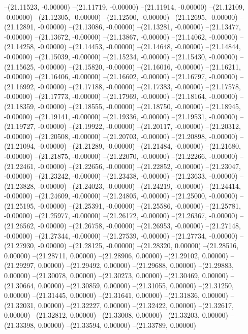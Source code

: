 --(21.11523, -0.00000)
--(21.11719, -0.00000)
--(21.11914, -0.00000)
--(21.12109, -0.00000)
--(21.12305, -0.00000)
--(21.12500, -0.00000)
--(21.12695, -0.00000)
--(21.12891, -0.00000)
--(21.13086, -0.00000)
--(21.13281, -0.00000)
--(21.13477, -0.00000)
--(21.13672, -0.00000)
--(21.13867, -0.00000)
--(21.14062, -0.00000)
--(21.14258, -0.00000)
--(21.14453, -0.00000)
--(21.14648, -0.00000)
--(21.14844, -0.00000)
--(21.15039, -0.00000)
--(21.15234, -0.00000)
--(21.15430, -0.00000)
--(21.15625, -0.00000)
--(21.15820, -0.00000)
--(21.16016, -0.00000)
--(21.16211, -0.00000)
--(21.16406, -0.00000)
--(21.16602, -0.00000)
--(21.16797, -0.00000)
--(21.16992, -0.00000)
--(21.17188, -0.00000)
--(21.17383, -0.00000)
--(21.17578, -0.00000)
--(21.17773, -0.00000)
--(21.17969, -0.00000)
--(21.18164, -0.00000)
--(21.18359, -0.00000)
--(21.18555, -0.00000)
--(21.18750, -0.00000)
--(21.18945, -0.00000)
--(21.19141, -0.00000)
--(21.19336, -0.00000)
--(21.19531, -0.00000)
--(21.19727, -0.00000)
--(21.19922, -0.00000)
--(21.20117, -0.00000)
--(21.20312, -0.00000)
--(21.20508, -0.00000)
--(21.20703, -0.00000)
--(21.20898, -0.00000)
--(21.21094, -0.00000)
--(21.21289, -0.00000)
--(21.21484, -0.00000)
--(21.21680, -0.00000)
--(21.21875, -0.00000)
--(21.22070, -0.00000)
--(21.22266, -0.00000)
--(21.22461, -0.00000)
--(21.22656, -0.00000)
--(21.22852, -0.00000)
--(21.23047, -0.00000)
--(21.23242, -0.00000)
--(21.23438, -0.00000)
--(21.23633, -0.00000)
--(21.23828, -0.00000)
--(21.24023, -0.00000)
--(21.24219, -0.00000)
--(21.24414, -0.00000)
--(21.24609, -0.00000)
--(21.24805, -0.00000)
--(21.25000, -0.00000)
--(21.25195, -0.00000)
--(21.25391, -0.00000)
--(21.25586, -0.00000)
--(21.25781, -0.00000)
--(21.25977, -0.00000)
--(21.26172, -0.00000)
--(21.26367, -0.00000)
--(21.26562, -0.00000)
--(21.26758, -0.00000)
--(21.26953, -0.00000)
--(21.27148, -0.00000)
--(21.27344, -0.00000)
--(21.27539, -0.00000)
--(21.27734, -0.00000)
--(21.27930, -0.00000)
--(21.28125, -0.00000)
--(21.28320, 0.00000)
--(21.28516, 0.00000)
--(21.28711, 0.00000)
--(21.28906, 0.00000)
--(21.29102, 0.00000)
--(21.29297, 0.00000)
--(21.29492, 0.00000)
--(21.29688, 0.00000)
--(21.29883, 0.00000)
--(21.30078, 0.00000)
--(21.30273, 0.00000)
--(21.30469, 0.00000)
--(21.30664, 0.00000)
--(21.30859, 0.00000)
--(21.31055, 0.00000)
--(21.31250, 0.00000)
--(21.31445, 0.00000)
--(21.31641, 0.00000)
--(21.31836, 0.00000)
--(21.32031, 0.00000)
--(21.32227, 0.00000)
--(21.32422, 0.00000)
--(21.32617, 0.00000)
--(21.32812, 0.00000)
--(21.33008, 0.00000)
--(21.33203, 0.00000)
--(21.33398, 0.00000)
--(21.33594, 0.00000)
--(21.33789, 0.00000)
